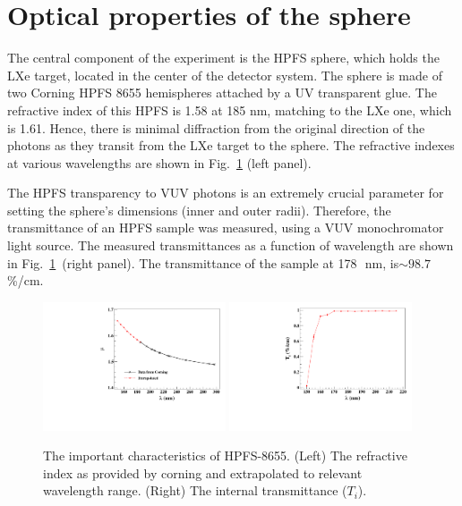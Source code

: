 \section{Optical properties of the sphere }
\label{sec:opt}

The central component of the experiment is the HPFS sphere, which holds the LXe target, located in the center 
of the detector system. The sphere is made of two Corning HPFS 8655 hemispheres attached by a UV transparent glue. 
The refractive index of this HPFS is 1.58 at 185 nm, matching to the LXe one, which is 1.61. Hence, there is minimal 
diffraction from the original direction of the photons as they transit from the LXe target to the sphere. The refractive 
indexes at various wavelengths are shown in Fig.~\ref{fig:hpfsRIcalibration} (left panel).


The HPFS transparency to VUV photons is an extremely crucial parameter for setting the sphere's dimensions (inner and outer radii). 
Therefore, the transmittance of an HPFS sample was measured, using a VUV monochromator light source. 
The measured transmittances as a function of wavelength are shown in Fig.~\ref{fig:hpfsRIcalibration}~(right panel). The 
transmittance of the sample at 178~\,nm, is$\sim98.7$\,\%/cm.  

\begin{figure}[h]
   \centering
   \includegraphics[width=0.48\textwidth]{RI-calibration.pdf}
    \includegraphics[width=0.48\textwidth]{IntTransmittance.pdf}
   \caption{The important characteristics of HPFS-8655. (Left) The refractive index as provided by corning and 
   extrapolated to relevant wavelength range. (Right) The internal transmittance ($T_{i}$).} 
   \label{fig:hpfsRIcalibration}
\end{figure}


